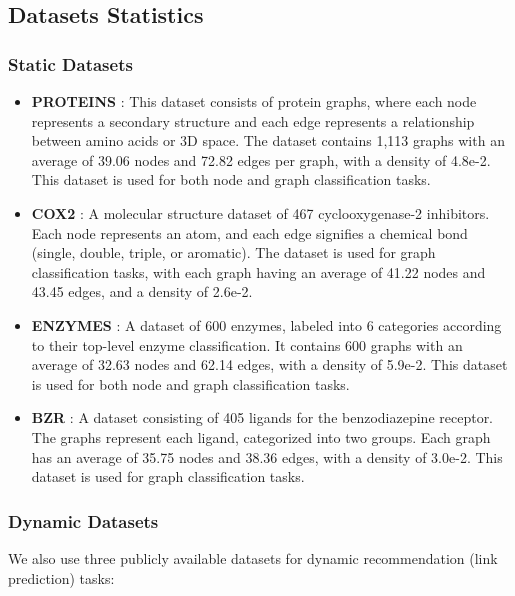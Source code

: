 \subsection{Datasets Statistics}
\label{app:dataset_stats}
\subsubsection{Static Datasets}

\begin{itemize}
    \item \textbf{PROTEINS} \cite{protein_reference}: This dataset consists of protein graphs, where each node represents a secondary structure and each edge represents a relationship between amino acids or 3D space. The dataset contains 1,113 graphs with an average of 39.06 nodes and 72.82 edges per graph, with a density of 4.8e-2. This dataset is used for both node and graph classification tasks.
    \item \textbf{COX2} \cite{cox2_reference}: A molecular structure dataset of 467 cyclooxygenase-2 inhibitors. Each node represents an atom, and each edge signifies a chemical bond (single, double, triple, or aromatic). The dataset is used for graph classification tasks, with each graph having an average of 41.22 nodes and 43.45 edges, and a density of 2.6e-2.
    \item \textbf{ENZYMES} \cite{enzymes_reference}: A dataset of 600 enzymes, labeled into 6 categories according to their top-level enzyme classification. It contains 600 graphs with an average of 32.63 nodes and 62.14 edges, with a density of 5.9e-2. This dataset is used for both node and graph classification tasks.
    \item \textbf{BZR} \cite{bzr_reference}: A dataset consisting of 405 ligands for the benzodiazepine receptor. The graphs represent each ligand, categorized into two groups. Each graph has an average of 35.75 nodes and 38.36 edges, with a density of 3.0e-2. This dataset is used for graph classification tasks.
\end{itemize}

\subsubsection{Dynamic Datasets}
We also use three publicly available datasets for dynamic recommendation (link prediction) tasks:

